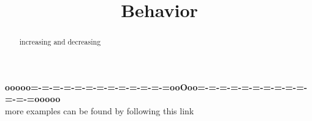 \documentclass{ximera}
\title{Behavior}
\begin{document}
\begin{abstract}
increasing and decreasing
\end{abstract}
\maketitle













\begin{center}
\textbf{\textcolor{green!50!black}{ooooo=-=-=-=-=-=-=-=-=-=-=-=-=ooOoo=-=-=-=-=-=-=-=-=-=-=-=-=ooooo}} \\

more examples can be found by following this link\\ 

\end{center}
\end{document}
